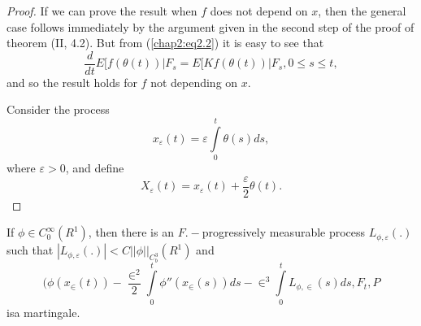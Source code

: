 \begin{proof}
If we can prove the result when $f$ does not depend on $x$, then the
general case follows immediately by the argument given in the second
step of the proof of theorem (II, 4.2). But from (\ref{chap2:eq2.2})
it is easy to see that  
$$
\frac{d}{dt} E[f(\theta(t)) |F_s = E[Kf (\theta(t)) |F_s , 0 \le s \le
    t, 
$$
and so the result holds for $f$ not depending on $x$.  

Consider the process
\begin{equation*}
x_\varepsilon (t) = \varepsilon\int\limits^t_0 \theta(s)ds,
\tag{2.4}\label{chap2:eq2.4}   
\end{equation*}
where $\varepsilon > 0$, and define 
\begin{equation*}
X_\varepsilon (t) = x_\varepsilon(t) + \frac{\varepsilon}{2} \theta
(t). \tag{2.5}\label{chap2:eq2.5}  
\end{equation*}
\end{proof}

\setcounter{lemma}{5}
\begin{lemma} %
If $\phi \in C^\infty_0 (R^1)$, then there is an $F.-$progressively
measurable process $L_{\phi, \varepsilon}(.)$ such that $|L_{\phi,
  \varepsilon}(.)| < C || \phi ||_{C^3_b}(R^1)$  and 
$$
(\phi (x_\in (t)) - \dfrac{\in ^2}{2}
\int \limits^t_0 \phi''(x_\in(s)) ds - \in^3 \int \limits^t_0 L_{\phi ,
  \in}(s)ds, F_t, P
$$ 
is\pageoriginale a martingale. 
\end{lemma}

